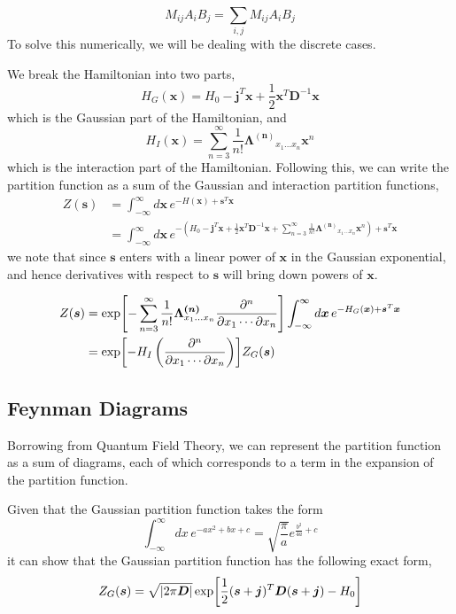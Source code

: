 \documentclass[letterpaper,12pt]{article}
\begin{document}
\[
M_{ij}A_{i}B_{j} = \sum_{i,j}M_{ij}A_{i}B_{j}
\]
To solve this numerically, we will be dealing with the discrete cases.

\vspace*{0.5cm}
We break the Hamiltonian into two parts, 
$$H_{G}(\bm{x}) = H_{0} - \bm{j}^{T}\bm{x} + \frac{1}{2}\bm{x}^{T}\bm{D}^{-1}\bm{x}$$
which is the Gaussian part of the Hamiltonian, and 
$$H_{I}(\bm{x}) = \sum_{n=3}^{\infty} \frac{1}{n!} \bm{\Lambda^{(n)}}_{x_{1} \dots x_{n}} \bm{x}^{n}$$
which is the interaction part of the Hamiltonian.
Following this, we can write the partition function as a sum of the Gaussian and interaction partition functions,
\begin{align}
    Z(\bm{s}) &= \int_{-\infty}^{\infty} d\bm{x} \, e^{-H(\bm{x}) + \bm{s}^{T}\bm{x}} \\
    &= \int_{-\infty}^{\infty} d\bm{x} \, e^{-(H_{0} - \bm{j}^{T}\bm{x} + \frac{1}{2}\bm{x}^{T}\bm{D}^{-1}\bm{x} + \sum_{n=3}^{\infty} \frac{1}{n!} \bm{\Lambda^{(n)}}_{x_{1} \dots x_{n}} \bm{x}^{n}) + \bm{s}^{T}\bm{x}} 
\end{align}
we note that since $\bm{s}$ enters with a linear power of $\bm{x}$ in the Gaussian exponential, and hence derivatives with respect to $\bm{s}$ will bring down powers of $\bm{x}$. 

\begin{align}
    Z(\bm{s}) &= \exp[-\sum_{n=3}^{\infty} \frac{1}{n!} \bm{\Lambda^{(n)}}_{x_{1} \dots x_{n}} \pdv{^{n}}{x_{1} \cdots \partial x_{n}}] \int_{-\infty}^{\infty} d\bm{x} \, e^{-H_{G}(\bm{x}) + \bm{s}^{T}\bm{x}} \\
    &= \exp[-H_{I}\left(\pdv{^{n}}{x_{1} \cdots \partial x_{n}}\right)] Z_{G}(\bm{s})
\end{align}
\subsection{Feynman Diagrams}

Borrowing from Quantum Field Theory, we can represent the partition function as a sum of diagrams, each of which corresponds to a term in the expansion of the partition function.

\vspace*{0.5cm}
Given that the Gaussian partition function takes the form 
\begin{equation}
    \int_{-\infty}^{\infty} dx \, e^{-ax^{2} + bx + c} = \sqrt{\frac{\pi}{a}} e^{\frac{b^{2}}{4a} + c}
\end{equation}
it can show that the Gaussian partition function has the following exact form,
\begin{equation}
    Z_{G}(\bm{s}) = \sqrt{\abs{2\pi \bm{D}}} \exp[\frac{1}{2}(\bm{s} + \bm{j})^{T}\bm{D}(\bm{s} + \bm{j}) - H_{0}]
\end{equation}
\end{document}
